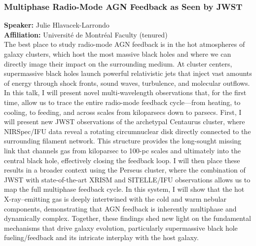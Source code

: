 \subsubsection*{Multiphase Radio-Mode AGN Feedback as Seen by JWST}
\textbf{Speaker:} Julie Hlavacek-Larrondo \\
\textbf{Affiliation:} Université de Montréal \textperiodcentered{} Faculty (tenured)\\
The best place to study radio-mode AGN feedback is in the hot atmospheres of galaxy clusters, which host the most massive black holes and where we can directly image their impact on the surrounding medium. At cluster centers, supermassive black holes launch powerful relativistic jets that inject vast amounts of energy through shock fronts, sound waves, turbulence, and molecular outflows. In this talk, I will present novel multi-wavelength observations that, for the first time, allow us to trace the entire radio-mode feedback cycle—from heating, to cooling, to feeding, and across scales from kiloparsecs down to parsecs. First, I will present new JWST observations of the archetypal Centaurus cluster, where NIRSpec/IFU data reveal a rotating circumnuclear disk directly connected to the surrounding filament network. This structure provides the long-sought missing link that channels gas from kiloparsec to 100-pc scales and ultimately into the central black hole, effectively closing the feedback loop. I will then place these results in a broader context using the Perseus cluster, where the combination of JWST with state-of-the-art XRISM and SITELLE/IFU observations allows us to map the full multiphase feedback cycle. In this system, I will show that the hot X-ray–emitting gas is deeply intertwined with the cold and warm nebular components, demonstrating that AGN feedback is inherently multiphase and dynamically complex. Together, these findings shed new light on the fundamental mechanisms that drive galaxy evolution, particularly supermassive black hole fueling/feedback and its intricate interplay with the host galaxy.

\hypertarget{abs-34}{}
